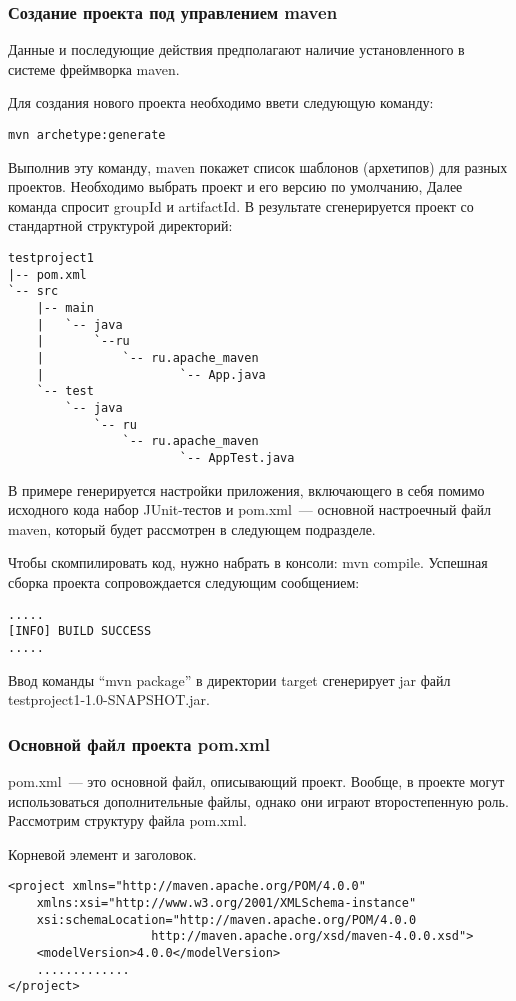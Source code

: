 \subsubsection{Создание проекта под управлением maven}
Данные и последующие действия предполагают наличие установленного в системе фреймворка maven.

Для создания нового проекта необходимо ввети следующую команду:
\begin{lstlisting}
mvn archetype:generate
\end{lstlisting}
 
	Выполнив эту команду, maven покажет список шаблонов (архетипов) для разных проектов. Необходимо выбрать проект и его версию по умолчанию, Далее команда спросит groupId и artifactId.
В результате сгенерируется проект со стандартной структурой директорий:
\begin{lstlisting}
testproject1
|-- pom.xml
`-- src
    |-- main
    |   `-- java
    |       `--ru
    |           `-- ru.apache_maven
    |                   `-- App.java
    `-- test
        `-- java
            `-- ru
                `-- ru.apache_maven
                        `-- AppTest.java
\end{lstlisting}
        
В примере генерируется настройки приложения, включающего в себя помимо исходного кода набор JUnit-тестов и pom.xml~--- основной настроечный файл maven, который будет рассмотрен в следующем подразделе.

Чтобы скомпилировать код, нужно набрать в консоли: mvn compile. Успешная сборка проекта сопровождается следующим сообщением:

\begin{lstlisting}
.....
[INFO] BUILD SUCCESS
.....
\end{lstlisting}

Ввод команды “mvn package” в директории target сгенерирует jar файл testproject1-1.0-SNAPSHOT.jar.

\subsubsection{Основной файл проекта pom.xml}
pom.xml~--- это основной файл, описывающий проект. Вообще, в проекте могут использоваться дополнительные файлы, однако они играют второстепенную роль. Рассмотрим структуру файла pom.xml.

Корневой элемент и заголовок.

\begin{lstlisting}
<project xmlns="http://maven.apache.org/POM/4.0.0"
    xmlns:xsi="http://www.w3.org/2001/XMLSchema-instance"
    xsi:schemaLocation="http://maven.apache.org/POM/4.0.0
                    http://maven.apache.org/xsd/maven-4.0.0.xsd">
    <modelVersion>4.0.0</modelVersion>
    .............
</project>
\end{lstlisting}

